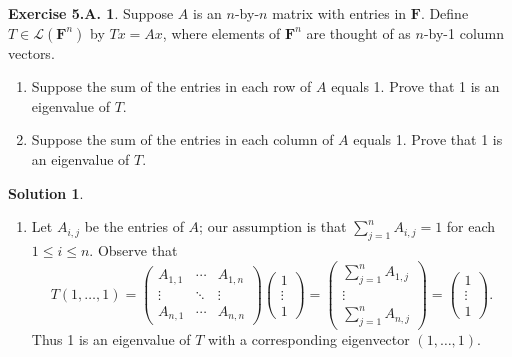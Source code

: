\documentclass[12pt]{article}
\theoremstyle{definition}
\theoremstyle{exercise}
\newtheorem{exercise}{Exercise 5.A.}
\theoremstyle{solution}
\newtheorem*{solution}{Solution}
\newcommand{\lmap}{\mathcal{L}}
\newcommand{\F}{\mathbf{F}}
\begin{document}
\begin{exercise}
\label{ex:24}
    Suppose \( A \) is an \( n \)-by-\( n \) matrix with entries in \( \F \). Define \( T \in \lmap(\F^n) \) by \( Tx = Ax \), where elements of \( \F^n \) are thought of as \( n \)-by-1 column vectors.
    \begin{enumerate}
        \item Suppose the sum of the entries in each row of \( A \) equals 1. Prove that 1 is an eigenvalue of \( T \).
        
        \item Suppose the sum of the entries in each column of \( A \) equals 1. Prove that 1 is an eigenvalue of \( T \).
    \end{enumerate}
\end{exercise}

\begin{solution}
    \begin{enumerate}
        \item Let \( A_{i,j} \) be the entries of \( A \); our assumption is that \( \sum_{j=1}^n A_{i,j} = 1 \) for each \( 1 \leq i \leq n \). Observe that
        \[
            T(1, \ldots, 1) =
            \begin{pmatrix}
                A_{1,1} & \cdots & A_{1,n} \\
                \vdots & \ddots & \vdots \\
                A_{n,1} & \cdots & A_{n,n}
            \end{pmatrix}
            \begin{pmatrix}
                1 \\
                \vdots \\
                1
            \end{pmatrix}
            =
            \begin{pmatrix}
                \sum_{j=1}^n A_{1,j} \\
                \vdots \\
                \sum_{j=1}^n A_{n,j}
            \end{pmatrix}
            =
            \begin{pmatrix}
                1 \\
                \vdots \\
                1
            \end{pmatrix}.
        \]
        Thus 1 is an eigenvalue of \( T \) with a corresponding eigenvector \( (1, \ldots, 1) \).


\end{enumerate}
\end{solution}
\end{document}
